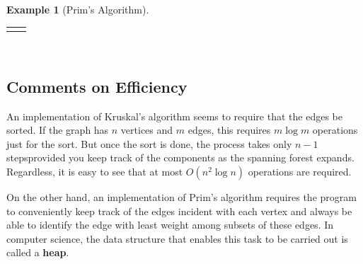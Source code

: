 \documentclass[10pt,]{book}
\newcommand{\terminology}[1]{\textbf{#1}}
\theoremstyle{plain}
\theoremstyle{definition}
\theoremstyle{definition}
\theoremstyle{definition}
\newtheorem{example}[theorem]{Example}
\theoremstyle{definition}
\numberwithin{equation}{section}
\newlength{\panelmax}
\begin{document}
\begin{example}[Prim's Algorithm]
{%
\par\medskip\noindent
\hspace*{0.0125\linewidth}%
\begin{tabular}{@{}*{2}{c}@{}}
\begin{minipage}[c][\panelmax][t]{0.78\linewidth}\usebox{\panelboxAp}\end{minipage}&
\begin{minipage}[c][\panelmax][t]{0.17\linewidth}\usebox{\panelboxApre}\end{minipage}\end{tabular}\\
}%
\end{example}
\typeout{************************************************}
\typeout{************************************************}
\subsection[{Comments on Efficiency}]{Comments on Efficiency}\label{subsection-22}
\hypertarget{p-182}{}%
An implementation of Kruskal's algorithm seems to require that the edges be sorted. If the graph has \(n\) vertices and \(m\) edges, this requires \(m\log m\) operations just for the sort. But once the sort is done, the process takes only \(n-1\) steps\textemdash{}provided you keep track of the components as the spanning forest expands.  Regardless, it is easy to see that at most \(O(n^2\log n)\) operations are required.%
\par
\hypertarget{p-183}{}%
On the other hand, an implementation of Prim's algorithm requires the program to conveniently keep track of the edges incident with each vertex and always be able to identify the edge with least weight among subsets of these edges. In computer science, the data structure that enables this task to be carried out is called a \terminology{heap}.%
\typeout{************************************************}
\typeout{************************************************}
\end{document}
